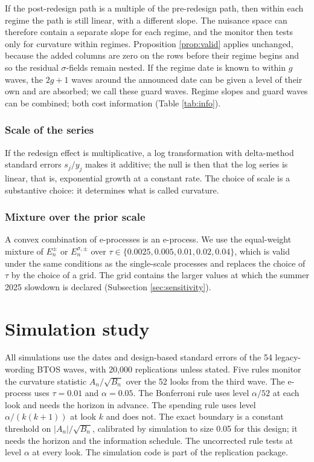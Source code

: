 \documentclass[Afour,sageh,times]{sagej}
\theoremstyle{definition}
\begin{document}
If the post-redesign path is a multiple of the pre-redesign path, then within each regime the path is still linear, with a different slope. The nuisance space can therefore contain a separate slope for each regime, and the monitor then tests only for curvature within regimes. Proposition \ref{prop:valid} applies unchanged, because the added columns are zero on the rows before their regime begins and so the residual $\sigma$-fields remain nested. If the regime date is known to within $g$ waves, the $2g+1$ waves around the announced date can be given a level of their own and are absorbed; we call these guard waves. Regime slopes and guard waves can be combined; both cost information (Table \ref{tab:info}).

\subsubsection{Scale of the series}

If the redesign effect is multiplicative, a log transformation with delta-method standard errors $s_j/y_j$ makes it additive; the null is then that the log series is linear, that is, exponential growth at a constant rate. The choice of scale is a substantive choice: it determines what is called curvature.

\subsubsection{Mixture over the prior scale}

A convex combination of e-processes is an e-process. We use the equal-weight mixture of $E_n^{\pm}$ or $E_n^{\sigma,\pm}$ over $\tau \in \{0.0025, 0.005, 0.01, 0.02, 0.04\}$, which is valid under the same conditions as the single-scale processes and replaces the choice of $\tau$ by the choice of a grid. The grid contains the larger values at which the summer 2025 slowdown is declared (Subsection \ref{sec:sensitivity}).

\section{Simulation study}
\label{sec:simulation}

All simulations use the dates and design-based standard errors of the 54 legacy-wording BTOS waves, with 20,000 replications unless stated. Five rules monitor the curvature statistic $A_n/\sqrt{B_n}$ over the 52 looks from the third wave. The e-process uses $\tau = 0.01$ and $\alpha = 0.05$. The Bonferroni rule uses level $\alpha/52$ at each look and needs the horizon in advance. The spending rule uses level $\alpha/(k(k+1))$ at look $k$ and does not. The exact boundary is a constant threshold on $|A_n|/\sqrt{B_n}$, calibrated by simulation to size 0.05 for this design; it needs the horizon and the information schedule. The uncorrected rule tests at level $\alpha$ at every look. The simulation code is part of the replication package.
\end{document}
